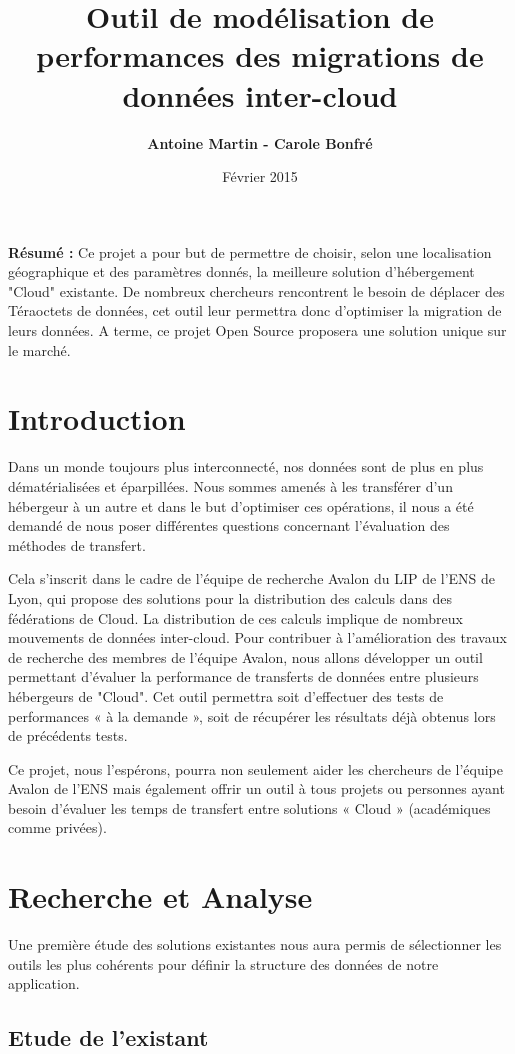 \documentclass[10pt]{article}
\title{\Huge{Outil de modélisation de performances des migrations de données inter-cloud}}
\author{\textbf{Antoine Martin - Carole Bonfré} }
\date{Février 2015}
\begin{document}
\maketitle

\textbf{Résumé : } Ce projet a pour but de permettre de choisir, selon
une localisation géographique et des paramètres donnés, la meilleure
solution d'hébergement "Cloud" existante. De nombreux chercheurs
rencontrent le besoin de déplacer des Téraoctets de données, cet outil
leur permettra donc d'optimiser la migration de leurs données. A
terme, ce projet Open Source proposera une solution unique sur le
marché.

\section{Introduction}

Dans un monde toujours plus interconnecté, nos données sont de plus en
plus dématérialisées et éparpillées. Nous sommes amenés à les
transférer d’un hébergeur à un autre et dans le but d’optimiser ces
opérations, il nous a été demandé de nous poser différentes questions
concernant l’évaluation des méthodes de transfert.

Cela s’inscrit dans le cadre de l’équipe de recherche Avalon du LIP de
l’ENS de Lyon, qui propose des solutions pour la distribution des
calculs dans des fédérations de Cloud. La distribution de ces calculs
implique de nombreux mouvements de données inter-cloud. Pour
contribuer à l’amélioration des travaux de recherche des membres de
l’équipe Avalon, nous allons développer un outil permettant d’évaluer
la performance de transferts de données entre plusieurs hébergeurs de
"Cloud". Cet outil permettra soit d’effectuer des tests de
performances « à la demande », soit de récupérer les résultats déjà
obtenus lors de précédents tests.

Ce projet, nous l’espérons, pourra non seulement aider les chercheurs
de l’équipe Avalon de l’ENS mais également offrir un outil à tous
projets ou personnes ayant besoin d’évaluer les temps de transfert
entre solutions « Cloud » (académiques comme privées).

\section{Recherche et Analyse}
Une première étude des solutions existantes nous aura permis de
sélectionner les outils les plus cohérents pour définir la structure
des données de notre application.
\subsection{Etude de l'existant}
\end{document}
